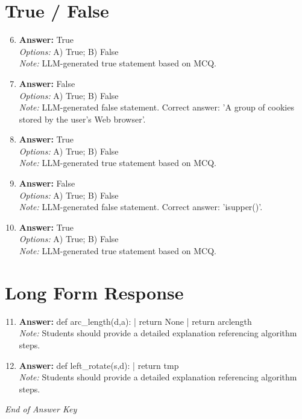 \documentclass[12pt]{article}
\begin{document}
\section*{True / False}
\begin{enumerate}[label=\arabic*.]
\setcounter{enumi}{5}
\item \textbf{Answer:} True
\\ \textit{Options:} A) True; B) False
\\ \textit{Note:} LLM-generated true statement based on MCQ.
\item \textbf{Answer:} False
\\ \textit{Options:} A) True; B) False
\\ \textit{Note:} LLM-generated false statement. Correct answer: 'A group of cookies stored by the user's Web browser'.
\item \textbf{Answer:} True
\\ \textit{Options:} A) True; B) False
\\ \textit{Note:} LLM-generated true statement based on MCQ.
\item \textbf{Answer:} False
\\ \textit{Options:} A) True; B) False
\\ \textit{Note:} LLM-generated false statement. Correct answer: 'isupper()'.
\item \textbf{Answer:} True
\\ \textit{Options:} A) True; B) False
\\ \textit{Note:} LLM-generated true statement based on MCQ.
\end{enumerate}

\section*{Long Form Response}
\begin{enumerate}[label=\arabic*.]
\setcounter{enumi}{10}
\item \textbf{Answer:} def arc\_length(d,a): | return None | return arclength
\\ \textit{Note:} Students should provide a detailed explanation referencing algorithm steps.
\item \textbf{Answer:} def left\_rotate(s,d): | return tmp
\\ \textit{Note:} Students should provide a detailed explanation referencing algorithm steps.
\end{enumerate}

\vfill
\noindent\textit{End of Answer Key}
\end{document}
